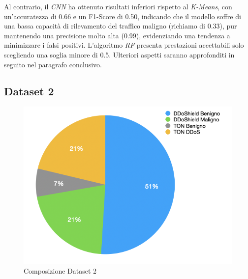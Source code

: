 Al contrario, il \textit{CNN} ha ottenuto risultati inferiori rispetto al \textit{K-Means}, con un'accuratezza di 0.66 e un F1-Score di 0.50, indicando che il modello soffre di una bassa capacità di rilevamento del traffico maligno (richiamo di 0.33), pur mantenendo una precisione molto alta (0.99), evidenziando una tendenza a minimizzare i falsi positivi.
L'algoritmo \textit{RF} presenta prestazioni accettabili solo scegliendo una soglia minore di 0.5.
Ulteriori aspetti saranno approfonditi in seguito nel paragrafo conclusivo.

\subsection{Dataset 2}

\begin{figure}[htbp]
\centering
\includegraphics[scale= 0.8]{UNINA_MSc_Thesis_Project/img/chapterRisulati/composizione_DATASET_2.png}
  \caption{Composizione Dataset 2}
\end{figure}


\begin{table}[htbp]
\centering
\renewcommand{\arraystretch}{1.5} %
\caption{Metriche di performance per Dataset 2}
\label{tab:performance_metrics}
\end{table}

